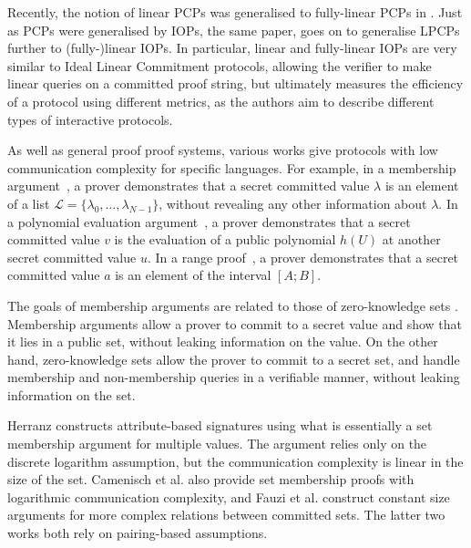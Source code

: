 Recently, the notion of linear PCPs was generalised to fully-linear PCPs in \cite{BonehBCGI19}. Just as PCPs were generalised by IOPs, the same paper, \cite{BonehBCGI19} goes on to generalise LPCPs further to (fully-)linear IOPs. In particular, linear and fully-linear IOPs are very similar to Ideal Linear Commitment protocols, allowing the verifier to make linear queries on a committed proof string, but ultimately measures the efficiency of a protocol using different metrics, as the authors aim to describe different types of interactive protocols.

As well as general proof proof systems, various works give protocols with low communication complexity for specific languages. For example, in a membership argument~\cite{BS01,BDD07}, a prover demonstrates that a secret committed value $\lambda$ is an element of a list $\mathcal{L} = \{ \lambda_0,\ldots,\lambda_{N-1}\}$, without revealing any other information about $\lambda$. In a polynomial evaluation argument~\cite{FO97,BDD07}, a prover demonstrates that a secret committed value $v$ is the evaluation of a public polynomial $h(U)$ at another secret committed value $u$. In a range proof~\cite{Bou02,Lip03}, a prover demonstrates that a secret committed value $a$ is an element of the interval $[A;B]$.

The goals of membership arguments are related to those of zero-knowledge sets \cite{Micali}. Membership arguments allow a prover to commit to a secret value and show that it lies in a public set, without leaking information on the value. On the other hand, zero-knowledge sets allow the prover to commit to a secret set, and handle membership and non-membership queries in a verifiable manner, without leaking information on the set.

Herranz constructs attribute-based signatures \cite{Herranz} using what is essentially a set membership argument for multiple values. The argument relies only on the discrete logarithm assumption, but the communication complexity is linear in the size of the set. Camenisch et al. \cite{Camenisch2008} also provide set membership proofs with logarithmic communication complexity, and Fauzi et al. \cite{Fauzi2014} construct constant size arguments for more complex relations between committed sets. The latter two works both rely on pairing-based assumptions.

